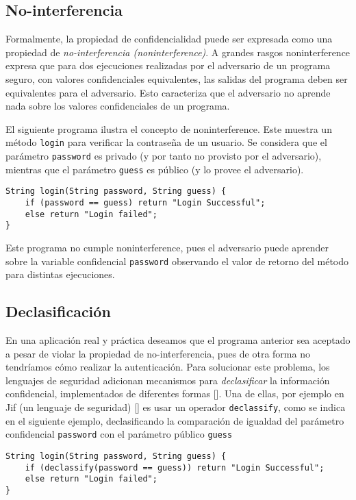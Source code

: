 	\subsection{No-interferencia}
	Formalmente, la propiedad de confidencialidad puede ser expresada como una propiedad de \textit{no-interferencia (noninterference)}. A grandes rasgos noninterference expresa que para dos ejecuciones realizadas por el adversario de un programa seguro, con valores confidenciales equivalentes, las salidas del programa deben ser equivalentes para el adversario. Esto caracteriza que el adversario no aprende nada sobre los valores confidenciales de un programa.

	El siguiente programa ilustra el concepto de noninterference. Este muestra un método \texttt{login} para verificar la contraseña de un usuario. Se considera que el parámetro \texttt{password} es privado (y por tanto no provisto por el adversario), mientras que el parámetro \texttt{guess} es público (y lo provee el adversario).

	\begin{lstlisting}
String login(String password, String guess) {
	if (password == guess) return "Login Successful";
	else return "Login failed";
}
	\end{lstlisting}

	Este programa no cumple noninterference, pues el adversario puede aprender sobre la variable confidencial \texttt{password} observando el valor de retorno del método para distintas ejecuciones.

	\subsection{Declasificación}
	En una aplicación real y práctica deseamos que el programa anterior sea aceptado a pesar de violar la propiedad de no-interferencia, pues de otra forma no tendríamos cómo realizar la autenticación. Para solucionar este problema, los lenguajes de seguridad adicionan mecanismos para \textit{declasificar} la información confidencial, implementados de diferentes formas []. Una de ellas, por ejemplo en Jif (un lenguaje de seguridad) [] es usar un operador \texttt{declassify}, como se indica en el siguiente ejemplo, declasificando la comparación de igualdad del parámetro confidencial \texttt{password} con el parámetro público \texttt{guess} %

\begin{lstlisting}
String login(String password, String guess) {
	if (declassify(password == guess)) return "Login Successful";
	else return "Login failed";
}
\end{lstlisting}

